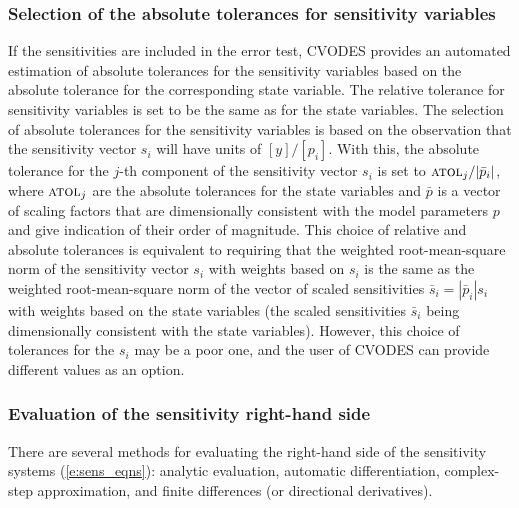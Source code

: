 \subsubsection{Selection of the absolute tolerances for sensitivity variables}
If the sensitivities are included in the error test, CVODES provides an 
automated estimation of absolute tolerances for the sensitivity variables 
based on the absolute tolerance for the corresponding state variable.
The relative tolerance for sensitivity variables is set to be the same as for 
the state variables. The selection of absolute tolerances for the sensitivity 
variables is based on the observation that the sensitivity vector $s_i$ will have 
units of $[y]/[p_i]$.
With this, the absolute tolerance for the $j$-th component of the sensitivity
vector $s_i$ is set to ${\mbox{\sc atol}_j}/{|{\bar p}_i|}$,
where $\mbox{\sc atol}_j$ are the absolute tolerances for the state variables and $\bar p$
is a vector of scaling factors that are dimensionally consistent with
the model parameters $p$ and give indication of their order of magnitude.
This choice of relative and absolute tolerances is equivalent 
to requiring that the weighted root-mean-square norm of the sensitivity 
vector $s_i$ with weights based on $s_i$ is the same as the
weighted root-mean-square norm of the vector of scaled sensitivities 
${\bar s}_i = |{\bar p}_i| s_i$ with weights based on the state variables
(the scaled sensitivities ${\bar s}_i$ being dimensionally consistent with the
state variables).
%
However, this choice of tolerances for the $s_i$ may be a poor one, and the user 
of CVODES can provide different values as an option.

\subsubsection{Evaluation of the sensitivity right-hand side}
There are several methods for evaluating the right-hand side of the sensitivity 
systems (\ref{e:sens_eqns}): analytic evaluation, automatic differentiation, 
complex-step approximation, and finite differences (or directional derivatives).

